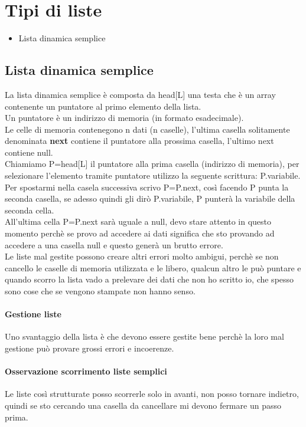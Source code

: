 \section{Tipi di liste}
\begin{itemize}
    \item Lista dinamica semplice
\end{itemize}
\subsection{Lista dinamica semplice}
La lista dinamica semplice è composta da head[L] una testa che è un array contenente un puntatore
al primo elemento della lista.\\
Un puntatore è un indirizzo di memoria (in formato esadecimale).\\
Le celle di memoria contenegono n dati (n caselle), l'ultima casella solitamente denominata
\textbf{next} contiene il puntatore alla prossima casella, l'ultimo next contiene null.\\
Chiamiamo P=head[L] il puntatore alla prima casella (indirizzo di memoria), per selezionare 
l'elemento tramite puntatore utilizzo la seguente scrittura: P.variabile.\\
Per spostarmi nella casela successiva scrivo P=P.next, così facendo P punta la seconda casella,
se adesso quindi gli dirò P.variabile, P punterà la variabile della seconda cella.\\
All'ultima cella P=P.next sarà uguale a null, devo stare attento in questo momento perchè se provo
ad accedere ai dati significa che sto provando ad accedere a una casella null e questo generà
un brutto errore.\\
Le liste mal gestite possono creare altri errori molto ambigui, perchè se non cancello le caselle di
memoria utilizzata e le libero, qualcun altro le può puntare e quando scorro la lista vado a 
prelevare dei dati che non ho scritto io, che spesso sono cose che se vengono stampate non
hanno senso.\\
\paragraph*{Gestione liste} Uno svantaggio della lista è che devono essere gestite bene
perchè la loro mal gestione può provare grossi errori e incoerenze.
\paragraph*{Osservazione scorrimento liste semplici} Le liste così strutturate posso
scorrerle solo in avanti, non posso tornare indietro, quindi se sto cercando una casella da cancellare
mi devono fermare un passo prima.
